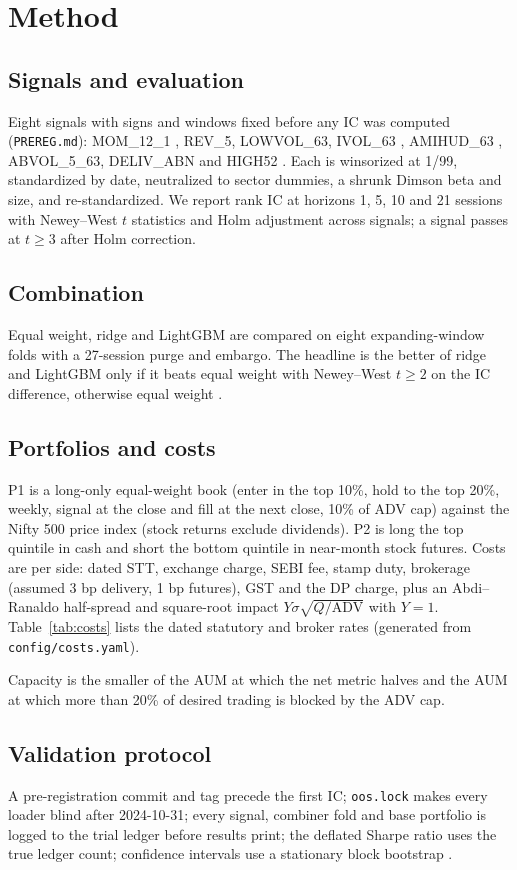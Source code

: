 \section{Method}\label{sec:method}
\subsection{Signals and evaluation}
Eight signals with signs and windows fixed before any IC was computed (\texttt{PREREG.md}): MOM\_12\_1 \citep{jegadeesh1993}, REV\_5, LOWVOL\_63, IVOL\_63 \citep{ang2006},
AMIHUD\_63 \citep{amihud2002}, ABVOL\_5\_63, DELIV\_ABN and HIGH52 \citep{george2004}. Each is winsorized at 1/99, standardized by date, neutralized to sector dummies, a shrunk Dimson beta and size, and
re-standardized. We report rank IC at horizons 1, 5, 10 and 21 sessions with Newey--West $t$ statistics \citep{newey1987} and Holm adjustment across signals; a
signal passes at $t\ge 3$ after Holm correction.
\subsection{Combination}
Equal weight, ridge and LightGBM are compared on eight expanding-window folds with a 27-session purge and embargo. The headline is the better of ridge and LightGBM only if it beats
equal weight with Newey--West $t\ge 2$ on the IC difference, otherwise equal weight \citep{ldp2018,gu2020}.
\subsection{Portfolios and costs}
P1 is a long-only equal-weight book (enter in the top 10\%, hold to the top 20\%, weekly, signal at the close and fill at the next close, 10\% of ADV cap) against the Nifty 500 price index (stock returns exclude dividends).
P2 is long the top quintile in cash and short the bottom quintile in near-month stock futures. Costs are per side: dated STT, exchange charge, SEBI fee, stamp duty, brokerage (assumed 3 bp
delivery, 1 bp futures), GST and the DP charge, plus an Abdi--Ranaldo half-spread \citep{abdi2017} and square-root impact $Y\sigma\sqrt{Q/\mathrm{ADV}}$ with $Y=1$.
Table~\ref{tab:costs} lists the dated statutory and broker rates (generated from \texttt{config/costs.yaml}).
\begin{table}[h]\centering\scriptsize{}\caption{Per-side cost schedule; the latest row on or before the trade date applies.}\label{tab:costs}\end{table}
Capacity is the smaller of the AUM at which the net metric halves and the AUM at which more than 20\% of desired trading is blocked by the ADV cap.
\subsection{Validation protocol}
A pre-registration commit and tag precede the first IC; \texttt{oos.lock} makes every loader blind after 2024-10-31; every signal, combiner fold and base portfolio is logged to the trial
ledger before results print; the deflated Sharpe ratio \citep{baileyldp2014} uses the true ledger count; confidence intervals use a stationary block bootstrap \citep{politis1994}.
